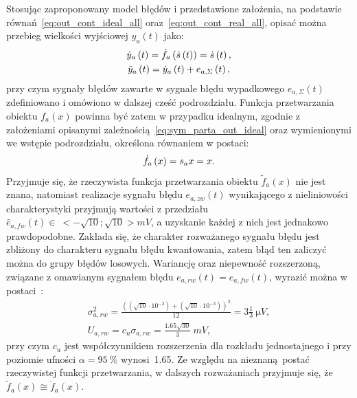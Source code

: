 Stosując zaproponowany model błędów i przedstawione założenia, na podstawie równań~\eqref{eq:out_cont_ideal_all} oraz~\eqref{eq:out_cont_real_all}, opisać można przebieg wielkości wyjściowej $y_{a}(t)$ jako:
\begin{gather}
\dot{y}_{a} \left(t\right) = \dot{f}_{a} \left(\dot{s} \left(t\right)\right) = \dot{s} \left(t\right) \label{eq:sym_parta_out_ideal}, \\
\tilde{y}_{a} \left(t\right) = \dot{y}_{a} \left(t\right) + e_{a,\Sigma} \left(t\right) \label{eq:sym_parta_out_real},
\end{gather}
przy czym sygnały błędów zawarte w sygnale błędu wypadkowego $e_{a,\Sigma}(t)$ zdefiniowano i omówiono w dalszej cześć podrozdziału. Funkcja przetwarzania obiektu $f_{a}(x)$ powinna być zatem w przypadku idealnym, zgodnie z założeniami opisanymi zależnością~\eqref{eq:sym_parta_out_ideal} oraz wymienionymi we wstępie podrozdziału, określona równaniem w postaci:
\begin{equation}
\dot{f}_{a} \left(x\right) = s_{a} x = x \label{eq:sym_parta_statfun}.
\end{equation}
Przyjmuje się, że rzeczywista funkcja przetwarzania obiektu $\tilde{f}_{a}(x)$ nie jest znana, natomiast realizacje sygnału błędu $e_{a,zw}(t)$ wynikającego z nieliniowości charakterystyki przyjmują wartości z przedziału $\hat{e}_{a,fw}(t) \in~<-\sqrt{10};\sqrt{10}>\unit{mV}$, a uzyskanie każdej z nich jest jednakowo prawdopodobne. Zakłada się, że charakter rozważanego sygnału błędu jest zbliżony do charakteru sygnału błędu kwantowania, zatem błąd ten zaliczyć można do grupy błędów losowych. Wariancję oraz niepewność rozszerzoną, związane z omawianym sygnałem błędu $e_{a,rw}(t) = e_{a,fw}(t)$, wyrazić można w postaci~\cite{jcgm_guide}:
\begin{gather}
\sigma_{a,rw}^{2} = \frac{\left( \left( \sqrt{10} \cdot 10^{-3} \right) + \left( \sqrt{10} \cdot 10^{-3} \right) \right)^{2}}{12} = 3 \frac{1}{3}~\unit{\micro V} \label{eq:sym_parta_rand_self_var}, \\
U_{a,rw} = c_{u} \sigma_{a,rw} = \frac{\num{1.65} \sqrt{30}}{3}~\unit{mV} \label{eq:sym_parta_rand_self_unc},
\end{gather}
przy czym $c_{u}$ jest współczynnikiem rozszerzenia dla rozkładu jednostajnego i przy poziomie ufności $\alpha = \qty{95}{\percent}$ wynosi~\num{1.65}. Ze względu na nieznaną postać rzeczywistej funkcji przetwarzania, w dalszych rozważaniach przyjmuje się, że $\tilde{f}_{a}(x)  \cong  \dot{f}_{a}(x)$.

